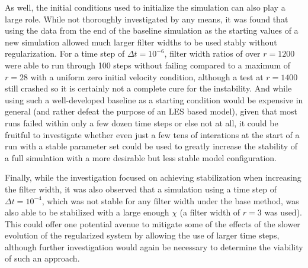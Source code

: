 As well, the initial conditions used to initialize the simulation can also play a large role. While not thoroughly investigated by any means, it was found that using the data from the end of the baseline simulation as the starting values of a new simulation allowed much larger filter widths to be used stably without regularization. For a time step of $\Delta t=10^{-6}$, filter width ratios of over $r=1200$ were able to run through 100 steps without failing compared to a maximum of $r=28$ with a uniform zero initial velocity condition, although a test at $r=1400$ still crashed so it is certainly not a complete cure for the instability. And while using such a well-developed baseline as a starting condition would be expensive in general (and rather defeat the purpose of an LES based model), given that most runs failed within only a few dozen time steps or else not at all, it could be fruitful to investigate whether even just a few tens of interations at the start of a run with a stable parameter set could be used to greatly increase the stability of a full simulation with a more desirable but less stable model configuration.

Finally, while the investigation focused on achieving stabilization when increasing the filter width, it was also observed that a simulation using a time step of $\Delta t=10^{-4}$, which was not stable for any filter width under the base method, was also able to be stabilized with a large enough $\chi$ (a filter width of $r=3$ was used). This could offer one potential avenue to mitigate some of the effects of the slower evolution of the regularized system by allowing the use of larger time steps, although further investigation would again be necessary to determine the viability of such an approach.
